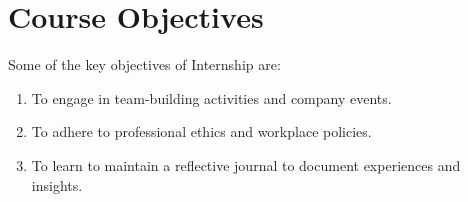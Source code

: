 
\section{Course Objectives}
Some of the key objectives of Internship are:
\begin{enumerate}
  \item To engage in team-building activities and company events.
  
  \item To adhere to professional ethics and workplace policies.
  
  \item To learn to maintain a reflective journal to document experiences and insights.
\end{enumerate}